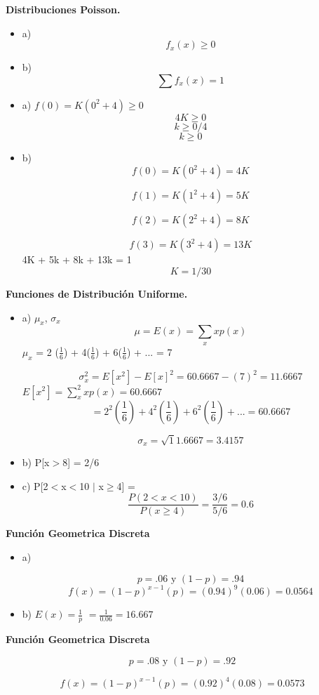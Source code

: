 \documentclass{../oxmathproblems}
\begin{document}
\begin{questions}
\miquestion\textbf{Distribuciones Poisson. }

\begin{itemize}
\item a) $$ f_x (x) \geq 0 $$ 
\item  b) $$ \sum f_x (x) = 1 $$
\end{itemize}


\begin{itemize}
\item a) $f(0) = K(0^2 + 4) \geq 0 $
$$ 4K \geq 0 $$
 $$ k \geq 0/ 4$$
$$ k \geq 0 $$

\item  b) 
$$f(0) = K(0^2 + 4) =  4K $$

$$f(1) = K(1^2 + 4) =  5K $$

$$f(2) = K(2^2 + 4) =  8K $$

$$f(3) = K(3^2 + 4) =  13K $$
4K + 5k + 8k + 13k = 1
$$ K = 1/30 $$
\end{itemize}

\miquestion\textbf{Funciones de Distribución Uniforme. }
\begin{itemize}
\item  a) $\mu_x$, $\sigma_x$
$$ \mu = E(x)= \sum_x xp(x)$$ 
 $\mu_x$ = 2 ($\frac{1}{6} $) + 4($\frac{1}{6} $) + 6($\frac{1}{6} $) + ... = 7 

$$ \sigma_x^2 = E[x^2]-E[x]^2 = 60.6667 - (7)^2 = 11.6667 $$ 
 $ E[x^2] = \sum_x^2 xp(x)  = 60.6667 $ 
 $$ = 2^2 (\frac{1}{6}) + 4^2(\frac{1}{6}) + 6^2(\frac{1}{6}) + ... =  60.6667 $$ 
 
 $$ \sigma_x  = \sqrt11.6667 = 3.4157 $$ 


\item  b) P[x$>$8] = 2/6

\item  c) P[2$<$x$<$10 $\mid$ x$\geq$4]
= $$  \frac{P(2 < x <10)}{P (x \geq 4)} = \frac{3/6}{5/6} = 0.6 $$ 
\end{itemize}

\miquestion\textbf { Función Geometrica Discreta}
\begin{itemize}
\item a)


$$ p = .06 \text{ y }
(1 - p )= .94 $$ 
$$ f(x) = (1-p)^{x-1} (p)  = (0.94)^9(0.06) = 0.0564 $$
\item b) 
$ E(x) = \frac{1}{p} $ 
$ = \frac{1}{0.06} = 16.667 $
\end{itemize}

\miquestion\textbf { Función Geometrica Discreta}

$$ p = .08 \text{ y }
(1 - p )= .92 $$ 

$$ f(x) = (1-p)^{x-1} (p)  = (0.92)^4(0.08) = 0.0573 $$

\end {questions}
\end{document}

